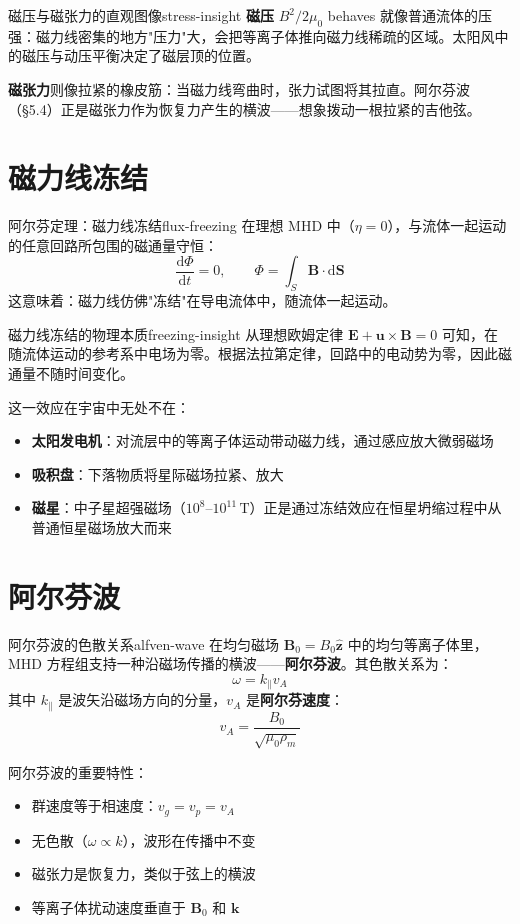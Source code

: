 \documentclass[12pt,a4paper,openany,oneside]{book}
\newcommand{\diff}{\mathrm{d}}
\newcommand{\vect}[1]{\bm{#1}}
\newcommand{\unitvec}[1]{\hat{\vect{#1}}}
\newcommand{\difficulty}[1]{\marginnote{\textcolor{red}{\textbf{[#1]}}}}
\begin{document}
\begin{insight}{磁压与磁张力的直观图像}{stress-insight}
\textbf{磁压} $B^2/2\mu_0$  behaves 就像普通流体的压强：磁力线密集的地方"压力"大，会把等离子体推向磁力线稀疏的区域。太阳风中的磁压与动压平衡决定了磁层顶的位置。

\textbf{磁张力}则像拉紧的橡皮筋：当磁力线弯曲时，张力试图将其拉直。阿尔芬波（\S5.4）正是磁张力作为恢复力产生的横波——想象拨动一根拉紧的吉他弦。
\end{insight}

\section{磁力线冻结}\difficulty{基础}

\begin{theorem}{阿尔芬定理：磁力线冻结}{flux-freezing}
在理想 MHD 中（$\eta = 0$），与流体一起运动的任意回路所包围的磁通量守恒：
\[
\frac{\diff\Phi}{\diff t} = 0, \qquad \Phi = \int_S \vect{B}\cdot\diff\vect{S}
\]
这意味着：磁力线仿佛"冻结"在导电流体中，随流体一起运动。
\end{theorem}

\begin{insight}{磁力线冻结的物理本质}{freezing-insight}
从理想欧姆定律 $\vect{E} + \vect{u}\times\vect{B} = 0$ 可知，在随流体运动的参考系中电场为零。根据法拉第定律，回路中的电动势为零，因此磁通量不随时间变化。

这一效应在宇宙中无处不在：
\begin{itemize}
\item \textbf{太阳发电机}：对流层中的等离子体运动带动磁力线，通过感应放大微弱磁场
\item \textbf{吸积盘}：下落物质将星际磁场拉紧、放大
\item \textbf{磁星}：中子星超强磁场（$10^{8}$--$10^{11}\,\mathrm{T}$）正是通过冻结效应在恒星坍缩过程中从普通恒星磁场放大而来
\end{itemize}
\end{insight}

\section{阿尔芬波}\difficulty{基础}

\begin{theorem}{阿尔芬波的色散关系}{alfven-wave}
在均匀磁场 $\vect{B}_0 = B_0\unitvec{z}$ 中的均匀等离子体里，MHD 方程组支持一种沿磁场传播的横波——\textbf{阿尔芬波}。其色散关系为：
\[
\omega = k_\parallel v_A
\]
其中 $k_\parallel$ 是波矢沿磁场方向的分量，$v_A$ 是\textbf{阿尔芬速度}：
\[
v_A = \frac{B_0}{\sqrt{\mu_0\rho_m}}
\]

阿尔芬波的重要特性：
\begin{itemize}
\item 群速度等于相速度：$v_g = v_p = v_A$
\item 无色散（$\omega \propto k$），波形在传播中不变
\item 磁张力是恢复力，类似于弦上的横波
\item 等离子体扰动速度垂直于 $\vect{B}_0$ 和 $\vect{k}$
\end{itemize}
\end{theorem}
\end{document}

